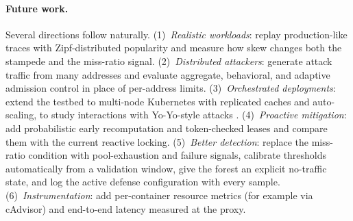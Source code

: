 \paragraph{Future work.} Several directions follow naturally. (1)~\emph{Realistic
workloads}: replay production-like traces with Zipf-distributed popularity and
measure how skew changes both the stampede and the miss-ratio signal. (2)~\emph{Distributed
attackers}: generate attack traffic from many addresses and evaluate aggregate,
behavioral, and adaptive admission control \cite{welsh2003,ranjan2009} in place of
per-address limits. (3)~\emph{Orchestrated deployments}: extend the testbed to
multi-node Kubernetes with replicated caches and auto-scaling, to study interactions
with Yo-Yo-style attacks \cite{sides2016,bremlerbarr2017}. (4)~\emph{Proactive
mitigation}: add probabilistic early recomputation \cite{vattani2015} and token-checked
leases \cite{kleppmann2016} and compare them with the current reactive locking.
(5)~\emph{Better detection}: replace the miss-ratio condition with pool-exhaustion and
failure signals, calibrate thresholds automatically from a validation window, give the
forest an explicit no-traffic state, and log the active defense configuration with
every sample. (6)~\emph{Instrumentation}: add per-container resource metrics (for
example via cAdvisor) and end-to-end latency measured at the proxy.
